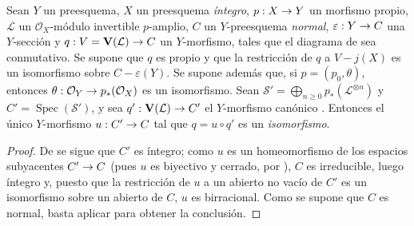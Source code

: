 \documentclass[oneside,10pt]{amsart}
\makeatletter
\newcommand{\ega@arrow}[2]{\mathchoice{#1}{#2}{#2}{#2}}
\renewcommand{\to}{\ega@arrow{\longrightarrow}{\rightarrow}}
\let\EGAOriginalLabel\label
\renewcommand{\label}[1]{\phantomsection\EGAOriginalLabel{#1}}
\makeatother
\begin{document}
\begin{proposition}[8.11.7]
\label{II.8.11.7-fr}
Sean $Y$ un preesquema, $X$ un preesquema \emph{íntegro}, $p:X\to Y$ un morfismo propio, $\mathcal{L}$ un $\mathcal{O}_X$-módulo invertible $p$-amplio, $C$ un $Y$-preesquema \emph{normal}, $\varepsilon:Y\to C$ una $Y$-sección y $q:V=\mathbf{V}(\mathcal{L})\to C$ un $Y$-morfismo, tales que el diagrama de  sea conmutativo.
Se supone que $q$ es propio y que la restricción de $q$ a $V-j(X)$ es un isomorfismo sobre $C-\varepsilon(Y)$.
Se supone además que, si $p=(p_0,\theta)$, entonces $\theta:\mathcal{O}_Y\to p_*(\mathcal{O}_X)$ es un isomorfismo.
Sean $\mathcal{S}'=\bigoplus_{n\geqslant0}p_*(\mathcal{L}^{\otimes n})$ y $C'=\operatorname{Spec}(\mathcal{S}')$, \textup{y} sea $q':\mathbf{V}(\mathcal{L})\to C'$ el $Y$-morfismo canónico .
Entonces el único $Y$-morfismo $u:C'\to C$ tal que $q=u\circ q'$ es un \emph{isomorfismo}.
\end{proposition}

\begin{proof}
De  se sigue que $C'$ es íntegro;
como $u$ es un homeomorfismo de los espacios subyacentes $C'\to C$ (pues $u$ es biyectivo y cerrado, por ), $C$ es irreducible, luego íntegro y, puesto que la restricción de $u$ a un abierto no vacío de $C'$ es un isomorfismo sobre un abierto de $C$, $u$ es birracional.
Como se supone que $C$ es normal, basta aplicar  para obtener la conclusión.
\end{proof}
\end{document}
